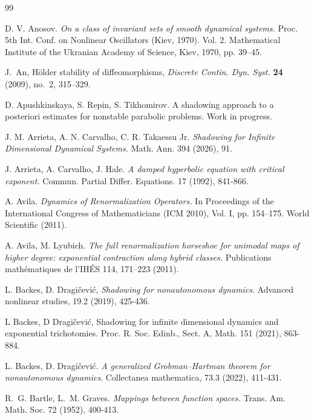 \documentclass[12pt]{article}
\theoremstyle{definition}
\begin{document}
\begin{thebibliography}{99}
{
\setlength{\itemsep}{0pt}
\footnotesize

 D. V. Anosov. \textit{On a class of invariant sets of smooth dynamical systems.} Proc. 5th Int. Conf. on Nonlinear Oscillators (Kiev, 1970). Vol. 2. Mathematical Institute of the Ukranian Academy of Science, Kiev, 1970, pp. 39–45. 

J.~An,
\newblock H\"older stability of diffeomorphisms,
\newblock \emph{Discrete Contin. Dyn. Syst.} \textbf{24} (2009), no.~2, 315--329.

D. Apushkinskaya, S. Repin, S. Tikhomirov. 
A shadowing approach to a posteriori estimates for nonstable parabolic problems.
Work in progress.

J. M. Arrieta, A. N. Carvalho, C. R. Takaessu Jr. \textit{Shadowing for Infinite Dimensional Dynamical Systems.} Math. Ann. 394 (2026), 91.

J. Arrieta, A. Carvalho, J. Hale. \textit{A damped hyperbolic equation with critical exponent.} Commun. Partial Differ. Equations. 17 (1992), 841-866.

A. Avila. \textit{Dynamics of Renormalization Operators.} In Proceedings of the International Congress of Mathematicians (ICM 2010), Vol. I, pp. 154–175. World Scientific (2011).

A. Avila, M. Lyubich. \textit{The full renormalization horseshoe for unimodal maps of higher degree: exponential contraction along hybrid classes.} Publications mathématiques de l’IHÉS 114, 171–223 (2011). 

L. Backes, D. Dragičević, \textit{Shadowing for nonautonomous dynamics}. Advanced nonlinear studies, 19.2 (2019), 425-436.

L Backes, D Dragičević,
Shadowing for infinite dimensional dynamics and exponential trichotomies.
	Proc. R. Soc. Edinb., Sect. A, Math. 151 (2021), 863-884.

L. Backes, D. Dragičević. \textit{A generalized Grobman–Hartman theorem for nonautonomous dynamics}. Collectanea mathematica, 73.3 (2022), 411-431.

R.~G. Bartle, L.~M. Graves.
\newblock \textit{Mappings between function spaces.}
\newblock Trans. Am. Math. Soc. 72 (1952), 400-413.

}
\end{thebibliography}
\end{document}
